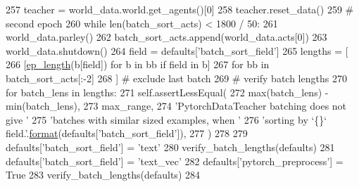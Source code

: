 \begin{DoxyCode}
257                 teacher = world\_data.world.get\_agents()[0]
258                 teacher.reset\_data()
259                 \textcolor{comment}{# second epoch}
260                 \textcolor{keywordflow}{while} len(batch\_sort\_acts) < 1800 / 50:
261                     world\_data.parley()
262                     batch\_sort\_acts.append(world\_data.acts[0])
263                 world\_data.shutdown()
264             field = defaults[\textcolor{stringliteral}{'batch\_sort\_field'}]
265             lengths = [
266                 [\hyperlink{namespaceparlai_1_1core_1_1pytorch__data__teacher_afbd22acd239efcdb6afb94db83ee3493}{ep\_length}(b[field]) \textcolor{keywordflow}{for} b \textcolor{keywordflow}{in} bb \textcolor{keywordflow}{if} field \textcolor{keywordflow}{in} b]
267                 \textcolor{keywordflow}{for} bb \textcolor{keywordflow}{in} batch\_sort\_acts[:-2]
268             ]  \textcolor{comment}{# exclude last batch}
269             \textcolor{comment}{# verify batch lengths}
270             \textcolor{keywordflow}{for} batch\_lens \textcolor{keywordflow}{in} lengths:
271                 self.assertLessEqual(
272                     max(batch\_lens) - min(batch\_lens),
273                     max\_range,
274                     \textcolor{stringliteral}{'PytorchDataTeacher batching does not give '}
275                     \textcolor{stringliteral}{'batches with similar sized examples, when '}
276                     \textcolor{stringliteral}{'sorting by `\{\}` field.'}.\hyperlink{namespaceparlai_1_1chat__service_1_1services_1_1messenger_1_1shared__utils_a32e2e2022b824fbaf80c747160b52a76}{format}(defaults[\textcolor{stringliteral}{'batch\_sort\_field'}]),
277                 )
278 
279         defaults[\textcolor{stringliteral}{'batch\_sort\_field'}] = \textcolor{stringliteral}{'text'}
280         verify\_batch\_lengths(defaults)
281         defaults[\textcolor{stringliteral}{'batch\_sort\_field'}] = \textcolor{stringliteral}{'text\_vec'}
282         defaults[\textcolor{stringliteral}{'pytorch\_preprocess'}] = \textcolor{keyword}{True}
283         verify\_batch\_lengths(defaults)
284 
\end{DoxyCode}
\mbox{\label{classtests_1_1test__pytorch__data__teacher_1_1TestPytorchDataTeacher_a17540e666ded187d76960e3ef3f43d7b}} 
